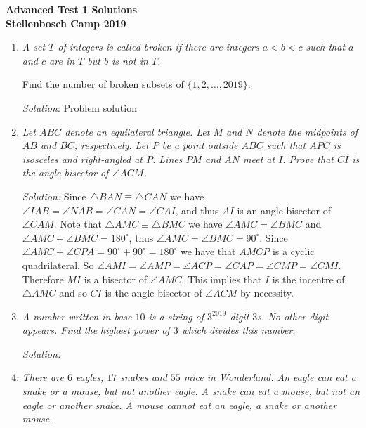 \documentclass{article}
\begin{document}
\begin{center}
  \textbf{\Large Advanced Test 1 Solutions}
  \\ \vspace{1em}
  \textbf{\large Stellenbosch Camp 2019}
\end{center}


\begin{enumerate}[1.]

\item %
{\itshape
A set $T$ of integers is called \emph{broken} if there are integers $a < b < c$ such that $a$ and $c$ are in $T$ but $b$ is not in $T$.

Find the number of broken subsets of $\{1, 2, \dotsc, 2019\}$.}

\textit{Solution}:
Problem solution


\item %
{\itshape
Let $ABC$ denote an equilateral triangle.
Let $M$ and $N$ denote the midpoints of $AB$ and $BC$, respectively.
Let $P$ be a point outside $ABC$ such that $APC$ is isosceles and right-angled at $P$.
Lines $PM$ and $AN$ meet at $I$.
Prove that $CI$ is the angle bisector of $\angle ACM$.}

\textit{Solution:}
Since $\triangle BAN \equiv \triangle CAN$ we have $\angle IAB = \angle NAB = \angle CAN = \angle CAI $, and thus $AI$ is an angle bisector of $\angle CAM$. Note that $\triangle AMC \equiv \triangle BMC$ we have $\angle AMC = \angle BMC$ and $\angle AMC + \angle BMC =180^\circ$, thus $\angle AMC = \angle BMC = 90^\circ$. Since $\angle AMC + \angle CPA = 90^\circ +90^\circ =180^\circ$ we have that $AMCP$ is a cyclic quadrilateral. So $\angle AMI = \angle AMP = \angle ACP = \angle CAP = \angle CMP = \angle CMI$. Therefore $MI$ is a bisector of $\angle AMC$. This implies that $I$ is the incentre of $\triangle AMC$ and so $CI$ is the angle bisector of $\angle ACM$ by necessity.


\item %
{\itshape
A number written in base $10$ is a string of $3^{2019}$ digit $3$s.
No other digit appears.
Find the highest power of $3$ which divides this number.}

\textit{Solution:}


\item %
{\itshape
There are $6$ eagles, $17$ snakes and $55$ mice in Wonderland.
An eagle can eat a snake or a mouse, but not another eagle.
A snake can eat a mouse, but not an eagle or another snake.
A mouse cannot eat an eagle, a snake or another mouse.

}
\end{enumerate}
\end{document}
